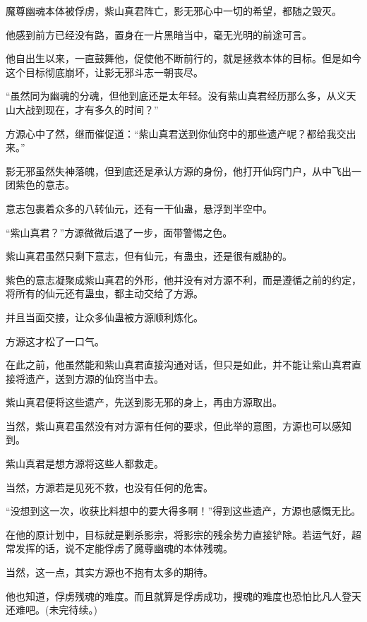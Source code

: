 \begin{this_body}
魔尊幽魂本体被俘虏，紫山真君阵亡，影无邪心中一切的希望，都随之毁灭。

他感到前方已经没有路，置身在一片黑暗当中，毫无光明的前途可言。

他自出生以来，一直鼓舞他，促使他不断前行的，就是拯救本体的目标。但是如今这个目标彻底崩坏，让影无邪斗志一朝丧尽。

“虽然同为幽魂的分魂，但他到底还是太年轻。没有紫山真君经历那么多，从义天山大战到现在，才有多久的时间？”

方源心中了然，继而催促道：“紫山真君送到你仙窍中的那些遗产呢？都给我交出来。”

影无邪虽然失神落魄，但到底还是承认方源的身份，他打开仙窍门户，从中飞出一团紫色的意志。

意志包裹着众多的八转仙元，还有一干仙蛊，悬浮到半空中。

“紫山真君？”方源微微后退了一步，面带警惕之色。

紫山真君虽然只剩下意志，但有仙元，有蛊虫，还是很有威胁的。

紫色的意志凝聚成紫山真君的外形，他并没有对方源不利，而是遵循之前的约定，将所有的仙元还有蛊虫，都主动交给了方源。

并且当面交接，让众多仙蛊被方源顺利炼化。

方源这才松了一口气。

在此之前，他虽然能和紫山真君直接沟通对话，但只是如此，并不能让紫山真君直接将遗产，送到方源的仙窍当中去。

紫山真君便将这些遗产，先送到影无邪的身上，再由方源取出。

当然，紫山真君虽然没有对方源有任何的要求，但此举的意图，方源也可以感知到。

紫山真君是想方源将这些人都救走。

当然，方源若是见死不救，也没有任何的危害。

“没想到这一次，收获比料想中的要大得多啊！”得到这些遗产，方源也感慨无比。

在他的原计划中，目标就是剿杀影宗，将影宗的残余势力直接铲除。若运气好，超常发挥的话，说不定能俘虏了魔尊幽魂的本体残魂。

当然，这一点，其实方源也不抱有太多的期待。

他也知道，俘虏残魂的难度。而且就算是俘虏成功，搜魂的难度也恐怕比凡人登天还难吧。(未完待续。)

\end{this_body}


